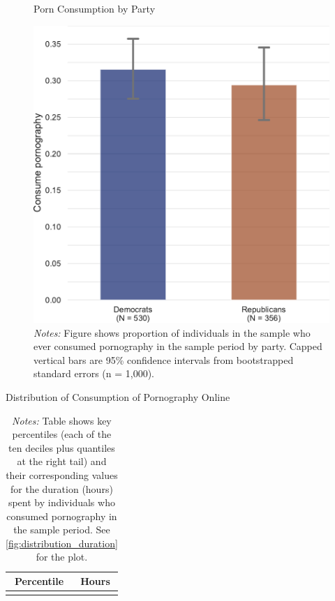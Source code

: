 \documentclass[12pt, letterpaper]{article}
\begin{document}
\begin{figure}
	\centering
	\caption{Porn Consumption by Party}
	\includegraphics[width=.5\textwidth]{../figs/consume_porn_yes_no.pdf}
	\caption*{\footnotesize \emph{Notes:} 
		Figure shows proportion of individuals in the sample who ever consumed pornography in the sample period by party.
		Capped vertical bars are 95\% confidence intervals from bootstrapped standard errors (n = 1,000).
	}
	\label{fig:consume_porn_yes_no}
\end{figure}


\begin{table}[ht] \centering \small \setlength\tabcolsep{10 pt}
	\caption{Distribution of Consumption of Pornography Online}
	\label{tab:distribution_duration}
	\begin{adjustbox}{max width=\textwidth}
		\begin{tabular}{cr}
			\toprule
			\multicolumn{1}{c}{\textbf{Percentile}}&\multicolumn{1}{c}{\textbf{Hours}}\\
			\midrule
			\\
			\bottomrule
		\end{tabular}
	\end{adjustbox}
	\caption*{\footnotesize \emph{Notes:} 
		Table shows key percentiles (each of the ten deciles plus quantiles at the right tail) and their corresponding values for the duration (hours) spent by individuals who consumed pornography in the sample period. 
		See \cref{fig:distribution_duration} for the plot.
	}
\end{table}
\end{document}
